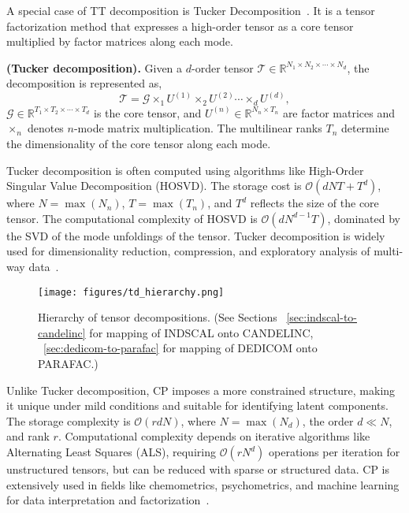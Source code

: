 A special case of TT decomposition is Tucker Decomposition~\cite{tucker1966some, zniyed2020high}. It is a tensor factorization method that expresses a high-order tensor as a core tensor multiplied by factor matrices along each mode. 

\begin{definition}\label{def:tucker}
    \textbf{(Tucker decomposition).} Given a $d$-order tensor $\mathcal{T} \in \mathbb{R}^{N_1 \times N_2 \times \cdots \times N_d}$, the decomposition is represented as, 
    \begin{equation}\label{eq:tucker}
        \mathcal{T} = \mathcal{G} \times_1 U^{(1)} \times_2 U^{(2)} \cdots \times_d U^{(d)},
    \end{equation}
     $\mathcal{G} \in \mathbb{R}^{T_1 \times T_2 \times \cdots \times T_d}$ is the core tensor, and $U^{(n)} \in \mathbb{R}^{N_n \times T_n}$ are factor matrices and $\times_n$ denotes $n$-mode matrix multiplication. The multilinear ranks $T_n$ determine the dimensionality of the core tensor along each mode.
\end{definition}

Tucker decomposition is often computed using algorithms like High-Order Singular Value Decomposition (HOSVD). The storage cost is $\mathcal{O}(dNT + T^d)$, where $N = \max(N_n)$, $T = \max(T_n)$, and $T^d$ reflects the size of the core tensor. The computational complexity of HOSVD is $\mathcal{O}(dN^{d-1}T)$, dominated by the SVD of the mode unfoldings of the tensor. Tucker decomposition is widely used for dimensionality reduction, compression, and exploratory analysis of multi-way data~\cite{kolda2009tensor}.

\begin{wrapfigure}{l}{0.5\textwidth}
      \centering
        \texttt{[image: figures/td\_hierarchy.png]}
    \caption{Hierarchy of tensor decompositions. (See Sections ~\ref{sec:indscal-to-candelinc} for mapping of INDSCAL onto CANDELINC, ~\ref{sec:dedicom-to-parafac} for mapping of DEDICOM onto PARAFAC.)}
    \label{fig:hierarchy}
\end{wrapfigure}


Unlike Tucker decomposition, CP imposes a more constrained structure, making it unique under mild conditions and suitable for identifying latent components. The storage complexity is $\mathcal{O}(rdN)$, where $N = \max(N_d)$, the order $d \ll N$, and rank $r$. Computational complexity depends on iterative algorithms like Alternating Least Squares (ALS), requiring $\mathcal{O}(rN^d)$ operations per iteration for unstructured tensors, but can be reduced with sparse or structured data. CP is extensively used in fields like chemometrics, psychometrics, and machine learning for data interpretation and factorization~\cite{kolda2009tensor}. 


